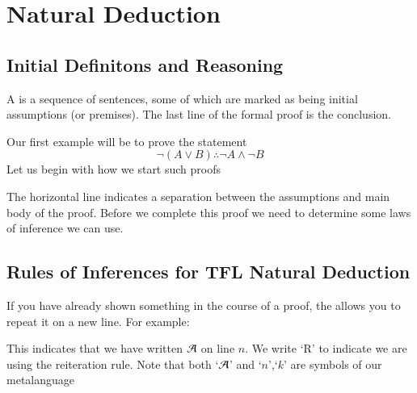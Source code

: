 %
%
%
\chapter{Natural Deduction}
\label{NatDeduct} %


\section{ Initial Definitons and Reasoning}

\begin{definition}
    A  is a sequence of sentences, some of which are marked as being initial assumptions (or premises). The last line of the formal proof is the conclusion.
\end{definition}

\begin{example}
    Our first example will be to prove the statement \begin{equation*}
        \lnot(A\lor B)\therefore \lnot A \wedge \lnot B
    \end{equation*}
    Let us begin with how we start such proofs\begin{fitchproof}
	\end{fitchproof}
    The horizontal line indicates a separation between the assumptions and main body of the proof. Before we complete this proof we need to determine some laws of inference we can use.
\end{example}

\section{ Rules of Inferences for TFL Natural Deduction}

\begin{definition}
    If you have already shown something in the course of a proof, the  allows you to repeat it on a new line. For example: 
    \begin{fitchproof}
        \have[$\vdots$]{}{\vdots}
         
    \end{fitchproof}
    This indicates that we have written $\mathcal{A}$ on line $n$. We write `R' to indicate we are using the reiteration rule. Note that both `$\mathcal{A}$' and `$n$',`$k$' are symbols of our metalanguage
\end{definition}


